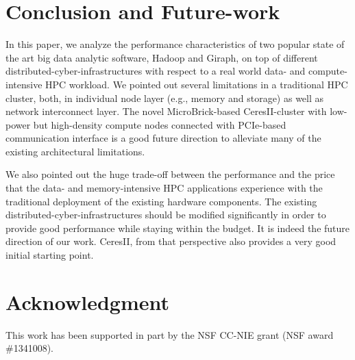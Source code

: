 \documentclass[10pt, conference, compsocconf]{IEEEtran}
\begin{document}
\section {Conclusion and Future-work} \label{conclusion}
In this paper, we analyze the performance characteristics of two popular state of the art big data analytic software, Hadoop and Giraph, on top of different distributed-cyber-infrastructures with respect to a real world data- and compute-intensive HPC workload. We pointed out several limitations in a traditional HPC cluster, both, in individual node layer (e.g., memory and storage) as well as network interconnect layer. The novel MicroBrick-based CeresII-cluster with low-power but high-density compute nodes connected with PCIe-based communication interface is a good future direction to alleviate many of the existing architectural limitations.

We also pointed out the huge trade-off between the performance and the price that the data- and memory-intensive HPC applications experience with the traditional deployment of the existing hardware components. The existing distributed-cyber-infrastructures should be modified significantly in order to provide good performance while staying within the budget. It is indeed the future direction of our work. CeresII, from that perspective also provides a very good initial starting point.



\section*{Acknowledgment}
This work has been supported in part by the NSF CC-NIE grant (NSF award
\#1341008).


%
%
\end{document}
